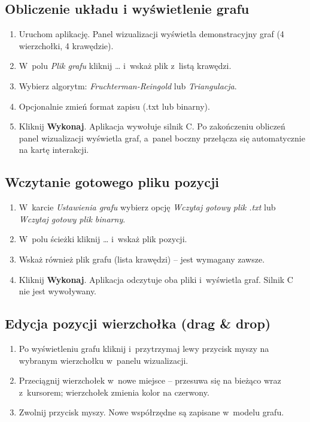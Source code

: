 \documentclass[12pt,a4paper]{article}
\begin{document}
\subsection{Obliczenie układu i wyświetlenie grafu}
\begin{enumerate}
    \item Uruchom aplikację. Panel wizualizacji wyświetla demonstracyjny graf (4 wierzchołki, 4 krawędzie).
    \item W~polu \textit{Plik grafu} kliknij \ldots{} i~wskaż plik z~listą krawędzi.
    \item Wybierz algorytm: \textit{Fruchterman-Reingold} lub \textit{Triangulacja}.
    \item Opcjonalnie zmień format zapisu (.txt lub binarny).
    \item Kliknij \textbf{Wykonaj}. Aplikacja wywołuje silnik C. Po zakończeniu obliczeń panel wizualizacji wyświetla graf, a~panel boczny przełącza się automatycznie na kartę interakcji.
\end{enumerate}

\subsection{Wczytanie gotowego pliku pozycji}
\begin{enumerate}
    \item W~karcie \textit{Ustawienia grafu} wybierz opcję \textit{Wczytaj gotowy plik .txt} lub \textit{Wczytaj gotowy plik binarny}.
    \item W~polu ścieżki kliknij \ldots{} i~wskaż plik pozycji.
    \item Wskaż również plik grafu (lista krawędzi) -- jest wymagany zawsze.
    \item Kliknij \textbf{Wykonaj}. Aplikacja odczytuje oba pliki i~wyświetla graf. Silnik C nie jest wywoływany.
\end{enumerate}

\subsection{Edycja pozycji wierzchołka (drag \& drop)}
\begin{enumerate}
    \item Po wyświetleniu grafu kliknij i~przytrzymaj lewy przycisk myszy na wybranym wierzchołku w~panelu wizualizacji.
    \item Przeciągnij wierzchołek w~nowe miejsce -- przesuwa się na bieżąco wraz z~kursorem; wierzchołek zmienia kolor na czerwony.
    \item Zwolnij przycisk myszy. Nowe współrzędne są zapisane w~modelu grafu.
\end{enumerate}
\end{document}
